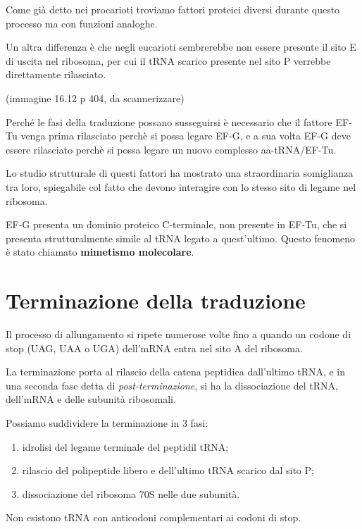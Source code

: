 \documentclass[11pt]{book}
\begin{document}
Come già detto nei procarioti troviamo fattori proteici diversi durante
questo processo ma con funzioni analoghe.

Un altra differenza è che negli eucarioti sembrerebbe non essere
presente il sito E di uscita nel ribosoma, per cui il tRNA scarico
presente nel sito P verrebbe direttamente rilasciato.

(immagine 16.12 p 404, da scannerizzare)

Perché le fasi della traduzione possano susseguirsi è necessario che il
fattore EF-Tu venga prima rilasciato perchè si possa legare EF-G, e a
sua volta EF-G deve essere rilasciato perchè si possa legare un nuovo
complesso aa-tRNA/EF-Tu.

Lo studio strutturale di questi fattori ha mostrato una straordinaria
somiglianza tra loro, spiegabile col fatto che devono interagire con lo
stesso sito di legame nel ribosoma.

EF-G presenta un dominio proteico C-terminale, non presente in EF-Tu,
che si presenta strutturalmente simile al tRNA legato a quest'ultimo.
Questo fenomeno è stato chiamato \textbf{mimetismo molecolare}.

\section{Terminazione della
traduzione}\label{terminazione-della-traduzione}

Il processo di allungamento si ripete numerose volte fino a quando un
codone di stop (UAG, UAA o UGA) dell'mRNA entra nel sito A del ribosoma.

La terminazione porta al rilascio della catena peptidica dall'ultimo
tRNA, e in una seconda fase detta di \emph{post-terminazione}, si ha la
dissociazione del tRNA, dell'mRNA e delle subunità ribosomali.

Possiamo suddividere la terminazione in 3 fasi:

\begin{enumerate}
\def\labelenumi{\arabic{enumi}.}
\itemsep1pt\parskip0pt
\item
  idrolisi del legame terminale del peptidil tRNA;
\item
  rilascio del polipeptide libero e dell'ultimo tRNA scarico dal sito P;
\item
  dissociazione del ribosoma 70S nelle due subunità.
\end{enumerate}

Non esistono tRNA con anticodoni complementari ai codoni di stop.
\end{document}
